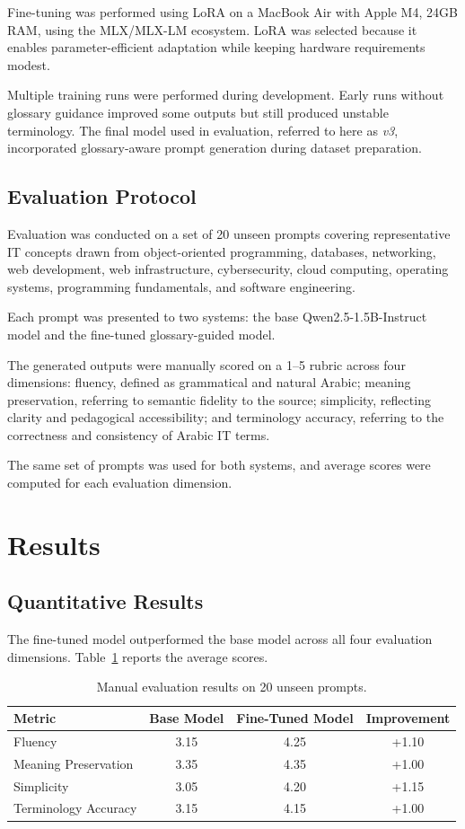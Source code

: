 \documentclass[education,article,submit,moreauthors]{Definitions/mdpi}
\begin{document}
Fine-tuning was performed using LoRA on a MacBook Air with Apple M4, 24GB RAM, using the MLX/MLX-LM ecosystem. LoRA was selected because it enables parameter-efficient adaptation while keeping hardware requirements modest.

Multiple training runs were performed during development. Early runs without glossary guidance improved some outputs but still produced unstable terminology. The final model used in evaluation, referred to here as \textit{v3}, incorporated glossary-aware prompt generation during dataset preparation.

\subsection{Evaluation Protocol}

Evaluation was conducted on a set of 20 unseen prompts covering representative IT concepts drawn from object-oriented programming, databases, networking, web development, web infrastructure, cybersecurity, cloud computing, operating systems, programming fundamentals, and software engineering.

Each prompt was presented to two systems: the base Qwen2.5-1.5B-Instruct model and the fine-tuned glossary-guided model.

The generated outputs were manually scored on a 1--5 rubric across four dimensions: fluency, defined as grammatical and natural Arabic; meaning preservation, referring to semantic fidelity to the source; simplicity, reflecting clarity and pedagogical accessibility; and terminology accuracy, referring to the correctness and consistency of Arabic IT terms.

The same set of prompts was used for both systems, and average scores were computed for each evaluation dimension.

\section{Results}

\subsection{Quantitative Results}

The fine-tuned model outperformed the base model across all four evaluation dimensions. Table~\ref{tab:main_results} reports the average scores.

\begin{table}[H]
\caption{Manual evaluation results on 20 unseen prompts.}
\label{tab:main_results}
\centering
\begin{tabular}{lccc}
\toprule
\textbf{Metric} & \textbf{Base Model} & \textbf{Fine-Tuned Model} & \textbf{Improvement} \\
\midrule
Fluency & 3.15 & 4.25 & +1.10 \\
Meaning Preservation & 3.35 & 4.35 & +1.00 \\
Simplicity & 3.05 & 4.20 & +1.15 \\
Terminology Accuracy & 3.15 & 4.15 & +1.00 \\
\bottomrule
\end{tabular}
\end{table}
\end{document}
